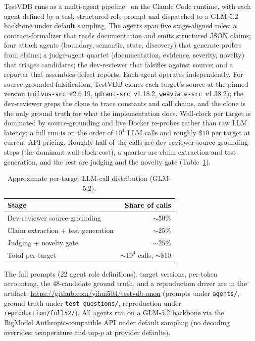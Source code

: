 \documentclass[sigconf]{acmart}
\begin{document}
TestVDB runs as a multi-agent pipeline~\cite{hou23llmse} on the Claude Code runtime, with each agent defined by a task-structured role prompt and dispatched to a GLM-5.2 backbone under default sampling. The agents span five stage-aligned roles: a contract-formalizer that reads documentation and emits structured JSON claims; four attack agents (boundary, semantic, state, discovery) that generate probes from claims; a judge-agent quartet (documentation, evidence, severity, novelty) that triages candidates; the dev-reviewer that falsifies against source; and a reporter that assembles defect reports. Each agent operates independently. For source-grounded falsification, TestVDB clones each target's source at the pinned version (\texttt{milvus-src}~v2.6.19, \texttt{qdrant-src}~v1.18.2, \texttt{weaviate-src}~v1.38.2); the dev-reviewer greps the clone to trace constants and call chains, and the clone is the only ground truth for what the implementation does. Wall-clock per target is dominated by source-grounding and live Docker re-probes rather than raw LLM latency; a full run is on the order of $10^4$ LLM calls and roughly $\$10$ per target at current API pricing. Roughly half of the calls are dev-reviewer source-grounding steps (the dominant wall-clock cost), a quarter are claim extraction and test generation, and the rest are judging and the novelty gate (Table~\ref{tab:cost}).

\begin{table}[t]
\caption{Approximate per-target LLM-call distribution (GLM-5.2).}
\label{tab:cost}
\small
\begin{tabular}{@{}lr@{}}
\toprule
Stage & Share of calls \\
\midrule
Dev-reviewer source-grounding & ${\sim}50\%$ \\
Claim extraction + test generation & ${\sim}25\%$ \\
Judging + novelty gate & ${\sim}25\%$ \\
\midrule
Total per target & ${\sim}10^4$ calls, ${\sim}\$10$ \\
\bottomrule
\end{tabular}
\end{table} The full prompts (22 agent role definitions), target versions, per-token accounting, the 48-candidate ground truth, and a reproduction driver are in the artifact: \url{https://github.com/yihui504/testvdb-anon} (prompts under \texttt{agents/}, ground truth under \texttt{test\_questions/}, reproduction under \texttt{reproduction/full52/}). All agents run on a GLM-5.2 backbone via the BigModel Anthropic-compatible API under default sampling (no decoding overrides; temperature and top-$p$ at provider defaults).
\end{document}
